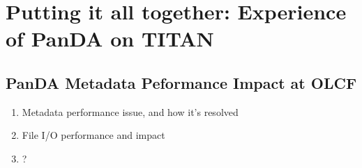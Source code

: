 \section{Putting it all together: Experience of PanDA on TITAN} %
\label{sec:panda_titan}

\subsection{PanDA Metadata Peformance Impact at OLCF}




\begin{enumerate}
  \item Metadata performance issue, and how it’s resolved
  \item File I/O performance and impact
  \item ?
\end{enumerate}




